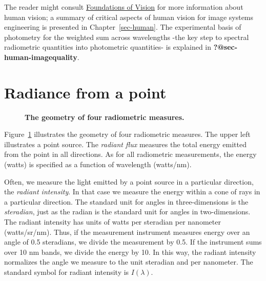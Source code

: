 \documentclass[
  letterpaper,
]{book}
\begin{document}
The reader might consult
\href{https://wandell.github.io/FOV-1995}{Foundations of Vision} for
more information about human vision; a summary of critical aspects of
human vision for image systems engineering is presented in
Chapter~\ref{sec-human}. The experimental basis of photometry for the
weighted sum across wavelengths -the key step to spectral radiometric
quantities into photometric quantities- is explained in
\textbf{?@sec-human-imagequality}.

\section{Radiance from a point}\label{radiance-from-a-point}

\begin{figure}


\caption{\label{fig-radiometry}\textbf{The geometry of four radiometric
measures.}}

\end{figure}%

Figure~\ref{fig-radiometry} illustrates the geometry of four radiometric
measures. The upper left illustrates a point source. The \emph{radiant
flux} measures the total energy emitted from the point in all
directions. As for all radiometric measurements, the energy (watts) is
specified as a function of wavelength (watts/nm).

Often, we measure the light emitted by a point source in a particular
direction, the \emph{radiant intensity}. In that case we measure the
energy within a cone of rays in a particular direction. The standard
unit for angles in three-dimensions is the \emph{steradian}, just as the
radian is the standard unit for angles in two-dimensions. The radiant
intensity has units of watts per steradian per nanometer (watts/sr/nm).
Thus, if the measurement instrument measures energy over an angle of 0.5
steradians, we divide the measurement by 0.5. If the instrument sums
over 10 nm bands, we divide the energy by 10. In this way, the radiant
intensity normalizes the angle we measure to the unit steradian and per
nanometer. The standard symbol for radiant intensity is \(I(\lambda)\).
\end{document}

